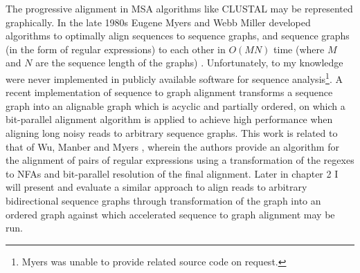 \documentclass[a4paper,12pt,numbered,oneside]{Classes/PhDThesisPSnPDF}
\begin{document}
The progressive alignment in MSA algorithms like CLUSTAL may be represented graphically.
In the late 1980s Eugene Myers and Webb Miller developed algorithms to optimally align sequences to sequence graphs, and sequence graphs (in the form of regular expressions) to each other in $O(MN)$ time (where $M$ and $N$ are the sequence length of the graphs) \cite{myers1989approximate,wu1995subquadratic}.
Unfortunately, to my knowledge were never implemented in publicly available software for sequence analysis\footnote{Myers was unable to provide related source code on request.}.
A recent implementation of sequence to graph alignment \cite{rautiainen2018bit} transforms a sequence graph into an alignable graph which is acyclic and partially ordered, on which a bit-parallel alignment algorithm is applied to achieve high performance when aligning long noisy reads to arbitrary sequence graphs.
This work is related to that of Wu, Manber and Myers \cite{wu1995subquadratic}, wherein the authors provide an algorithm for the alignment of pairs of regular expressions using a transformation of the regexes to NFAs and bit-parallel resolution of the final alignment.
Later in chapter 2 I will present and evaluate a similar approach to align reads to arbitrary bidirectional sequence graphs through transformation of the graph into an ordered graph against which accelerated sequence to graph alignment may be run.
\end{document}
